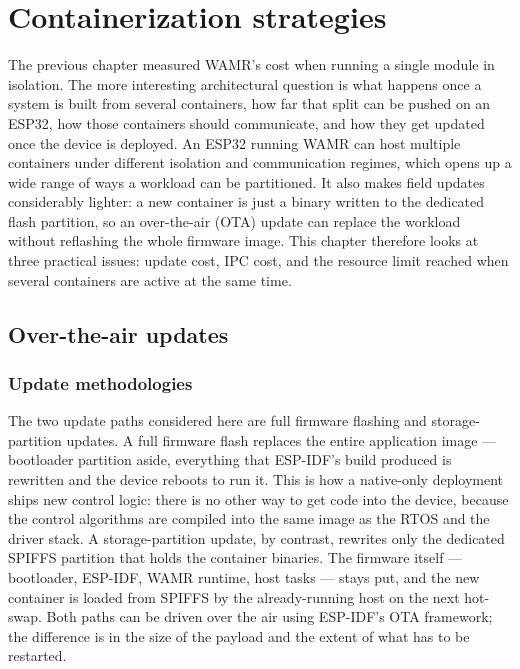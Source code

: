 \documentclass[12pt, a4paper]{report}
\begin{document}
\chapter{Containerization strategies}
\label{ch:containerization_strategy}
\label{ch:containerization}

The previous chapter measured WAMR's cost when running a single module in isolation. The more interesting architectural question is what happens once a system is built from several containers, how far that split can be pushed on an ESP32, how those containers should communicate, and how they get updated once the device is deployed. An ESP32 running WAMR can host multiple containers under different isolation and communication regimes, which opens up a wide range of ways a workload can be partitioned. It also makes field updates considerably lighter: a new container is just a binary written to the dedicated flash partition, so an over-the-air (OTA) update can replace the workload without reflashing the whole firmware image. This chapter therefore looks at three practical issues: update cost, IPC cost, and the resource limit reached when several containers are active at the same time.


\section{Over-the-air updates}
\label{sec:containerization-ota}

\subsection{Update methodologies}
\label{subsec:containerization-ota-methods}

The two update paths considered here are full firmware flashing and storage-partition updates. A full firmware flash replaces the entire application image --- bootloader partition aside, everything that ESP-IDF's build produced is rewritten and the device reboots to run it. This is how a native-only deployment ships new control logic: there is no other way to get code into the device, because the control algorithms are compiled into the same image as the RTOS and the driver stack. A storage-partition update, by contrast, rewrites only the dedicated SPIFFS partition that holds the container binaries. The firmware itself --- bootloader, ESP-IDF, WAMR runtime, host tasks --- stays put, and the new container is loaded from SPIFFS by the already-running host on the next hot-swap. Both paths can be driven over the air using ESP-IDF's OTA framework; the difference is in the size of the payload and the extent of what has to be restarted.
\end{document}
